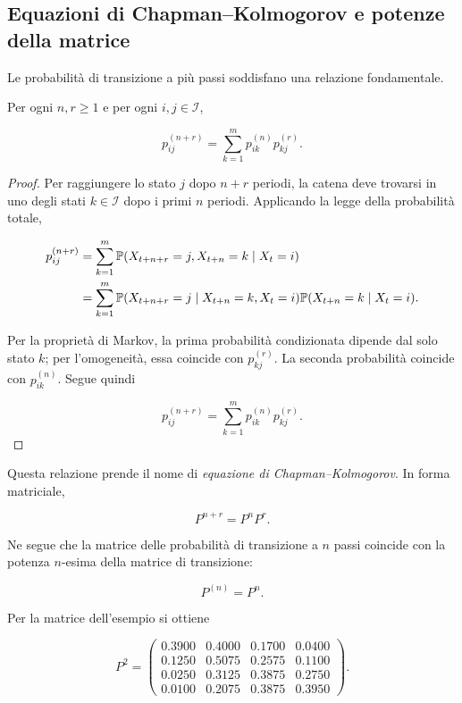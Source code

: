 \subsection{Equazioni di Chapman--Kolmogorov e potenze della matrice}

Le probabilit\`{a} di transizione a pi\`{u} passi soddisfano una
relazione fondamentale.

\begin{proposition}
Per ogni \(n,r\geq 1\) e per ogni \(i,j\in\mathcal{I}\),

\[
p_{ij}^{(n+r)}
=
\sum_{k=1}^{m}
p_{ik}^{(n)}p_{kj}^{(r)}.
\]
\end{proposition}

\begin{proof}
Per raggiungere lo stato \(j\) dopo \(n+r\) periodi, la catena deve
trovarsi in uno degli stati \(k\in\mathcal{I}\) dopo i primi \(n\)
periodi. Applicando la legge della probabilit\`{a} totale,

\[
\begin{split}
p_{ij}^{(n+r)}
&=
\sum_{k=1}^{m}
\mathbb{P}(X_{t+n+r}=j,X_{t+n}=k\mid X_t=i)
\\
&=
\sum_{k=1}^{m}
\mathbb{P}(X_{t+n+r}=j\mid X_{t+n}=k,X_t=i)
\mathbb{P}(X_{t+n}=k\mid X_t=i).
\end{split}
\]

Per la propriet\`{a} di Markov, la prima probabilit\`{a} condizionata
dipende dal solo stato \(k\); per l'omogeneit\`{a}, essa coincide con
\(p_{kj}^{(r)}\). La seconda probabilit\`{a} coincide con
\(p_{ik}^{(n)}\). Segue quindi

\[
p_{ij}^{(n+r)}
=
\sum_{k=1}^{m}
p_{ik}^{(n)}p_{kj}^{(r)}.
\]
\end{proof}

Questa relazione prende il nome di \emph{equazione di
Chapman--Kolmogorov}. In forma matriciale,

\[
P^{n+r}=P^nP^r.
\]

Ne segue che la matrice delle probabilit\`{a} di transizione a \(n\)
passi coincide con la potenza \(n\)-esima della matrice di transizione:

\[
P^{(n)}=P^n.
\]

Per la matrice dell'esempio si ottiene

\[
P^2
=
\begin{pmatrix}
0.3900 & 0.4000 & 0.1700 & 0.0400\\
0.1250 & 0.5075 & 0.2575 & 0.1100\\
0.0250 & 0.3125 & 0.3875 & 0.2750\\
0.0100 & 0.2075 & 0.3875 & 0.3950
\end{pmatrix}.
\]

